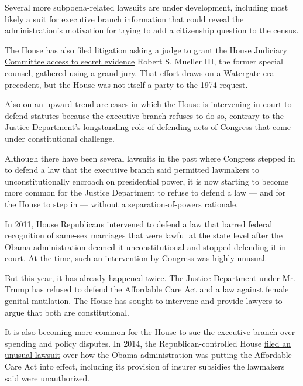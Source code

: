 Several more subpoena-related lawsuits are under development, including
most likely a suit for executive branch information that could reveal
the administration's motivation for trying to add a citizenship question
to the census.

The House has also filed litigation
\href{https://www.nytimes3xbfgragh.onion/2019/07/26/us/politics/donald-trump-impeachment.html}{asking
a judge to grant the House Judiciary Committee access to secret
evidence} Robert S. Mueller III, the former special counsel, gathered
using a grand jury. That effort draws on a Watergate-era precedent, but
the House was not itself a party to the 1974 request.

Also on an upward trend are cases in which the House is intervening in
court to defend statutes because the executive branch refuses to do so,
contrary to the Justice Department's longstanding role of defending acts
of Congress that come under constitutional challenge.

Although there have been several lawsuits in the past where Congress
stepped in to defend a law that the executive branch said permitted
lawmakers to unconstitutionally encroach on presidential power, it is
now starting to become more common for the Justice Department to refuse
to defend a law --- and for the House to step in --- without a
separation-of-powers rationale.

In 2011,
\href{https://www.nytimes3xbfgragh.onion/2011/03/05/us/politics/05marriage.html}{House
Republicans intervened} to defend a law that barred federal recognition
of same-sex marriages that were lawful at the state level after the
Obama administration deemed it unconstitutional and stopped defending it
in court. At the time, such an intervention by Congress was highly
unusual.

But this year, it has already happened twice. The Justice Department
under Mr. Trump has refused to defend the Affordable Care Act and a law
against female genital mutilation. The House has sought to intervene and
provide lawyers to argue that both are constitutional.

It is also becoming more common for the House to sue the executive
branch over spending and policy disputes. In 2014, the
Republican-controlled House
\href{https://www.nytimes3xbfgragh.onion/2014/11/22/us/politics/obamacare-lawsuit-filed-by-republicans.html}{filed
an unusual lawsuit} over how the Obama administration was putting the
Affordable Care Act into effect, including its provision of insurer
subsidies the lawmakers said were unauthorized.


